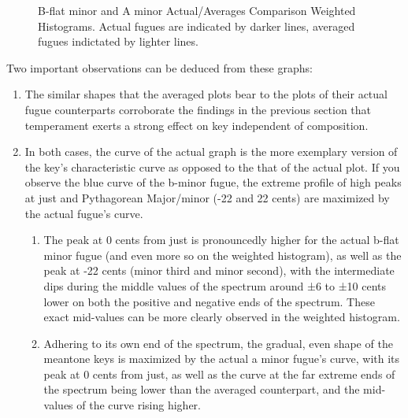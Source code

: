 \begin{figure}[H]
\vspace{1.5em}
    \centering
    \caption[B-flat minor and a minor Actual/Averages Comparison Weighted Histograms. ]{B-flat minor and A minor Actual/Averages Comparison Weighted Histograms. Actual fugues are indicated by darker lines, averaged fugues indictated by lighter lines.}
\end{figure}    Two important observations can be deduced from these graphs:

\begin{enumerate}
\def\labelenumi{\arabic{enumi}.}
\tightlist
\item
  The similar shapes that the averaged plots bear to the plots of their
  actual fugue counterparts corroborate the findings in the previous
  section that temperament exerts a strong effect on key independent of
  composition.
\item
  In both cases, the curve of the actual graph is the more exemplary
  version of the key's characteristic curve as opposed to the that of
  the actual plot. If you observe the blue curve of the b-minor fugue,
  the extreme profile of high peaks at just and Pythagorean Major/minor
  (-22 and 22 cents) are maximized by the actual fugue's curve.

  \begin{enumerate}
  \def\labelenumii{\arabic{enumii}.}
  \tightlist
  \item
    The peak at 0 cents from just is pronouncedly higher for the actual
    b-flat minor fugue (and even more so on the weighted histogram), as
    well as the peak at -22 cents (minor third and minor second), with
    the intermediate dips during the middle values of the spectrum
    around ±6 to ±10 cents lower on both the positive and negative ends
    of the spectrum. These exact mid-values can be more clearly observed
    in the weighted histogram.
  \item
    Adhering to its own end of the spectrum, the gradual, even shape of
    the meantone keys is maximized by the actual a minor fugue's curve,
    with its peak at 0 cents from just, as well as the curve at the far
    extreme ends of the spectrum being lower than the averaged
    counterpart, and the mid-values of the curve rising higher.
  \end{enumerate}
\end{enumerate}

